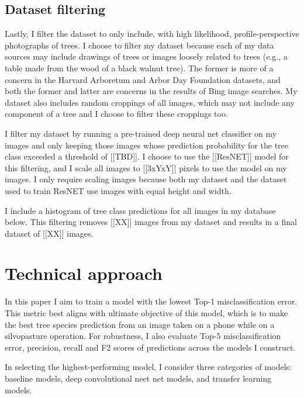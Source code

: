 \documentclass[10pt,twocolumn,letterpaper]{article}
\begin{document}
\subsection{Dataset filtering}

Lastly, I filter the dataset to only include, with high likelihood, profile-perspective photographs of trees. I choose to filter my dataset because each of my data sources may include drawings of trees or images loosely related to trees (e.g., a table made from the wood of a black walnut tree). The former is more of a concern in the Harvard Arboretum and Arbor Day Foundation datasets, and both the former and latter are concerns in the results of Bing image searches. My dataset also includes random croppings of all images, which may not include any component of a tree and I choose to filter these croppings too.

I filter my dataset by running a pre-trained deep neural net classifier on my images and only keeping those images whose prediction probability for the tree class exceeded a threshold of [[TBD]]. I choose to use the [[ResNET]] model for this filtering, and I scale all images to [[3xYxY]] pixels to use the model on my images. I only require scaling images because both my dataset and the dataset used to train ResNET use images with equal height and width. 

I include a histogram of tree class predictions for all images in my database below. This filtering removes [[XX]] images from my dataset and results in a final dataset of [[XX]] images.

\section{Technical approach}

In this paper I aim to train a model with the lowest Top-1 misclassification error. This metric best aligns with ultimate objective of this model, which is to make the best tree species prediction from an image taken on a phone while on a silvopasture operation. For robustness, I also evaluate Top-5 misclassification error, precision, recall and F2 scores of predictions across the models I construct. 

In selecting the highest-performing model, I consider three categories of models: baseline models, deep convolutional neet net models, and transfer learning models. 
\end{document}
